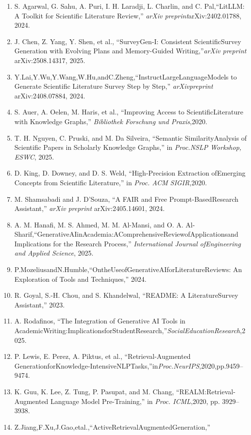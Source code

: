 \documentclass[
]{article}
\begin{document}
\begin{enumerate}
\item
  S. Agarwal, G. Sahu, A. Puri, I. H. Laradji, L. Charlin, and C. Pal,``LitLLM: A Toolkit for Scientific Literature Review,'' \emph{arXiv preprint}\protect{}\label{_bookmark40}{}arXiv:2402.01788, 2024.
\item
  J. Chen, Z. Yang, Y. Shen, et al., ``SurveyGen-I: Consistent ScientificSurvey Generation with Evolving Plans and Memory-Guided Writing,''\emph{arXiv preprint} arXiv:2508.14317, 2025.
\item
  \protect{}\label{_bookmark41}{}Y.Lai,Y.Wu,Y.Wang,W.Hu,andC.Zheng,``InstructLargeLanguageModels to Generate Scientific Literature Survey Step by Step,'' \emph{arXivpreprint} arXiv:2408.07884, 2024.
\item
  S. Auer, A. Oelen, M. Haris, et al., ``Improving Access to ScientificLiterature with Knowledge Graphs,'' \emph{Bibliothek Forschung und Praxis},2020.
\item
  T. H. Nguyen, C. Pruski, and M. Da Silveira, ``Semantic SimilarityAnalysis of Scientific Papers in Scholarly Knowledge Graphs,'' in \emph{Proc.NSLP Workshop, ESWC}, 2025.
\item
  D. King, D. Downey, and D. S. Weld, ``High-Precision Extraction ofEmerging Concepts from Scientific Literature,'' in \emph{Proc. ACM SIGIR},2020.
\item
  M. Shamsabadi and J. D'Souza, ``A FAIR and Free Prompt-BasedResearch Assistant,'' \emph{arXiv preprint} arXiv:2405.14601, 2024.
\item
  A. M. Hanafi, M. S. Ahmed, M. M. Al-Mansi, and O. A. Al-Sharif,``GenerativeAIinAcademia:AComprehensiveReviewofApplicationsand Implications for the Research Process,'' \emph{International Journal ofEngineering and Applied Science}, 2025.
\item
  P.MozeliusandN.Humble,``OntheUseofGenerativeAIforLiteratureReviews: An Exploration of Tools and Techniques,'' 2024.
\item
  R. Goyal, S.-H. Chou, and S. Khandelwal, ``README: A LiteratureSurvey Assistant,'' 2023.
\item
  A. Rodafinos, ``The Integration of Generative AI Tools in AcademicWriting:ImplicationsforStudentResearch,''\emph{SocialEducationResearch},\protect{}\label{_bookmark42}{}2025.
\item
  P. Lewis, E. Perez, A. Piktus, et al., ``Retrieval-Augmented GenerationforKnowledge-IntensiveNLPTasks,''in\emph{Proc.NeurIPS},2020,pp.9459--\protect{}\label{_bookmark43}{}9474.
\item
  K. Guu, K. Lee, Z. Tung, P. Pasupat, and M. Chang, ``REALM:Retrieval-Augmented Language Model Pre-Training,'' in \emph{Proc. ICML},\protect{}\label{_bookmark44}{}2020, pp. 3929--3938.
\item
  Z.Jiang,F.Xu,J.Gao,etal.,``ActiveRetrievalAugmentedGeneration,''
\end{enumerate}
\end{document}
